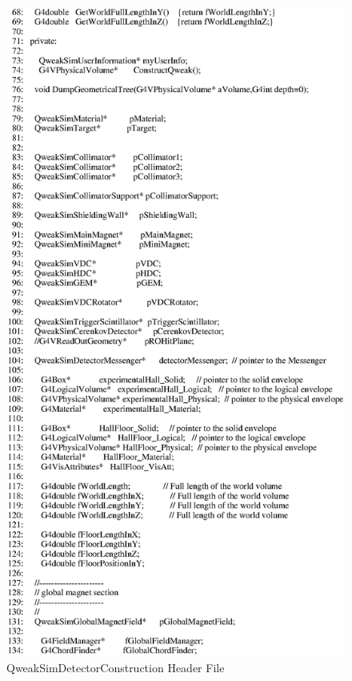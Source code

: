 \begin{figure}[ht]
  \hspace{0cm}
  \includegraphics[scale=0.8]{./figures4/QweakSimDetectorConstruction.hh-p2.eps}
  \caption{QweakSimDetectorConstruction Header File}
           \label{fig:IV-SC-2}
\end{figure}
\clearpage

